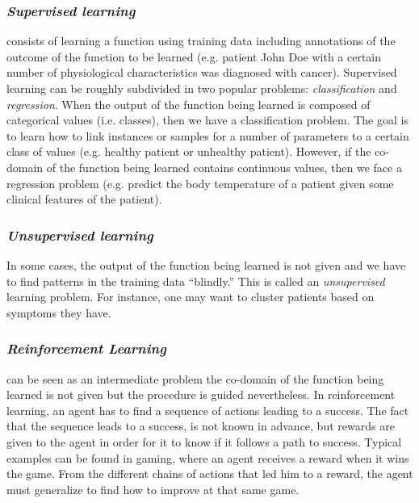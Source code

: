 \subsubsection{\emph{Supervised learning}} consists of learning a function using
training data including annotations of the outcome of the function to be learned
(e.g. patient John Doe with a certain number of physiological characteristics
was diagnosed with cancer). Supervised learning can be roughly subdivided in two
popular problems:
\emph{classification} and \emph{regression}. When the output of the function
being learned is composed of categorical values (i.e. classes), then we have a
classification problem. The goal is to learn how to link instances or samples
for a number of parameters to a certain class of values (e.g. healthy patient or
unhealthy patient). However, if the co-domain of the function being learned
contains continuous values, then we face a regression problem (e.g. predict the
body temperature of a patient given some clinical features of the patient).

\subsubsection{\emph{Unsupervised learning}} In some cases, the output of the
function being learned is not given and we have to find patterns in the training data ``blindly.'' This is called an
\emph{unsupervised} learning problem. For instance, one may want to cluster
patients based on symptoms they have.

\subsubsection{\emph{Reinforcement Learning}} can be seen as an intermediate
problem the co-domain of the function being learned is not given but the procedure is guided
nevertheless. In reinforcement learning, an agent has to find a sequence of
actions leading to a success. The fact that the sequence leads to a success, is
not known in advance, but rewards are given to the agent in order for it to know
if it follows a path to success. Typical examples can be found in gaming, where
an agent receives a reward when it wins the game. From the different chains of
actions that led him to a reward, the agent must generalize to find how to
improve at that same game.